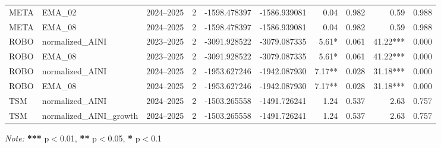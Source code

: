 \begin{table}[H]
{\begin{tabular}{l l l r r r r r r r}
META & EMA\_02 & 2024--2025 & 2 & -1598.478397 & -1586.939081 & 0.04 & 0.982 & 0.59 & 0.988 \\
META & EMA\_08 & 2024--2025 & 2 & -1598.478397 & -1586.939081 & 0.04 & 0.982 & 0.59 & 0.988 \\
ROBO & normalized\_AINI & 2023--2025 & 2 & -3091.928522 & -3079.087335 & 5.61* & 0.061 & 41.22*** & 0.000 \\
ROBO & EMA\_08 & 2023--2025 & 2 & -3091.928522 & -3079.087335 & 5.61* & 0.061 & 41.22*** & 0.000 \\
ROBO & normalized\_AINI & 2024--2025 & 2 & -1953.627246 & -1942.087930 & 7.17** & 0.028 & 31.18*** & 0.000 \\
ROBO & EMA\_08 & 2024--2025 & 2 & -1953.627246 & -1942.087930 & 7.17** & 0.028 & 31.18*** & 0.000 \\
TSM & normalized\_AINI & 2024--2025 & 2 & -1503.265558 & -1491.726241 & 1.24 & 0.537 & 2.63 & 0.757 \\
TSM & normalized\_AINI\_growth & 2024--2025 & 2 & -1503.265558 & -1491.726241 & 1.24 & 0.537 & 2.63 & 0.757 \\
\bottomrule
\end{tabular}

}
\vspace{0.2cm}
\textit{Note:} \textbf{***} p$<$0.01, \textbf{**} p$<$0.05, \textbf{*} p$<$0.1
\end{table}